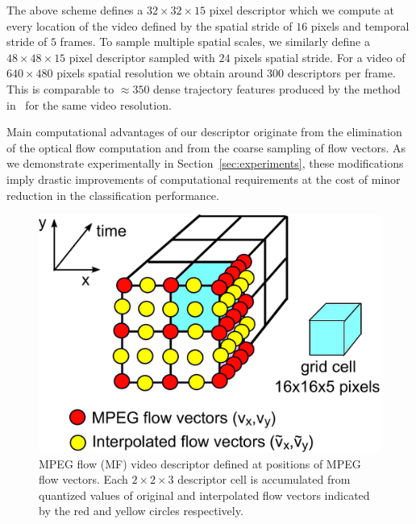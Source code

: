 \documentclass[10pt,twocolumn,letterpaper]{article}
\begin{document}
The above scheme defines a $32\times32\times15$ pixel descriptor which we compute at every location of the video defined by the spatial stride of $16$ pixels and temporal stride of $5$ frames. To sample multiple spatial scales, we similarly define a $48\times48\times15$ pixel descriptor sampled with $24$ pixels spatial stride. For a video of $640\times480$ pixels spatial resolution we obtain around 300 descriptors per frame. This is comparable to $\approx350$ dense trajectory features produced by the method in~\cite{Wang12} for the same video resolution.

Main computational advantages of our descriptor originate from the elimination of the optical flow computation and from the coarse sampling of flow vectors. As we demonstrate experimentally in Section~\ref{sec:experiments}, these modifications imply drastic improvements of computational requirements at the cost of minor reduction in the classification performance. 


\begin{figure}
\begin{center}
\includegraphics[width=.6\linewidth]{figures/CD-descriptor2.pdf}
\caption{MPEG flow (MF) video descriptor defined at positions of MPEG flow vectors. Each $2\times2\times3$ descriptor cell is accumulated from quantized values of original and interpolated flow vectors indicated by the red and yellow circles respectively.\vspace{-.6cm}}
\label{fig:CDdescriptor}
\end{center}
\end{figure}
\end{document}
